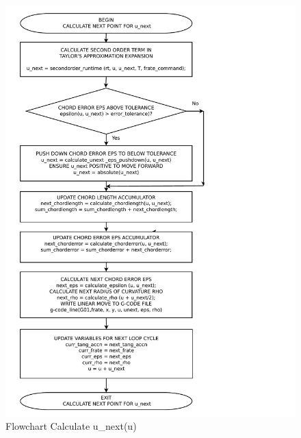 \begin{figure}
	\caption{Flowchart Calculate u\_next(u)}
	\label{04-Calculate-u-next-flowchart.pdf}
	\includegraphics[width=1.10\textwidth,]{Images/Chap3/04-Calculate-u-next-flowchart.pdf} 
\end{figure}

\clearpage
\pagebreak

